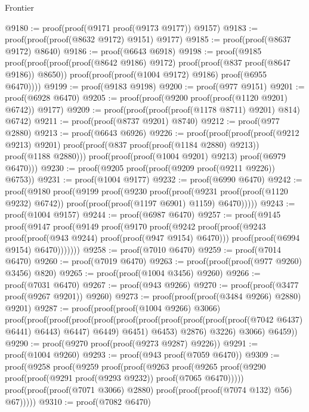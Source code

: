 \begin{lexlean}{Frontier}
\begin{coremodule}
@9180 := proof(proof(@9171 proof(@9173 @9177)) @9157)
@9183 := proof(proof(proof(@8632 @9172) @9151) @9177)
@9185 := proof(proof(@8637 @9172) @8640)
@9186 := proof(@6643 @6918)
@9198 := proof(@9185
      proof(proof(proof(proof(@8642 @9186) @9172) proof(proof(@837 proof(@8647 @9186)) @8650))
          proof(proof(proof(@1004 @9172) @9186) proof(@6955 @6470))))
@9199 := proof(@9183 @9198)
@9200 := proof(@977 @9151)
@9201 := proof(@6928 @6470)
@9205 := proof(proof(@9200 proof(proof(@1120 @9201) @6742)) @9177)
@9209 := proof(proof(proof(proof(@1178 @8711) @9201) @814) @6742)
@9211 := proof(proof(@8737 @9201) @8740)
@9212 := proof(@977 @2880)
@9213 := proof(@6643 @6926)
@9226 := proof(proof(proof(proof(@9212 @9213) @9201)
        proof(proof(@837 proof(proof(@1184 @2880) @9213)) proof(@1188 @2880)))
      proof(proof(proof(@1004 @9201) @9213) proof(@6979 @6470)))
@9230 := proof(@9205 proof(proof(@9209 proof(@9211 @9226)) @6753))
@9231 := proof(@1004 @9177)
@9232 := proof(@6990 @6470)
@9242 := proof(@9180
      proof(@9199
          proof(@9230
              proof(proof(@9231 proof(proof(@1120 @9232) @6742))
                  proof(proof(proof(@1197 @6901) @1159) @6470)))))
@9243 := proof(@1004 @9157)
@9244 := proof(@6987 @6470)
@9257 := proof(@9145
      proof(@9147
          proof(@9149
              proof(@9170
                  proof(@9242
                      proof(proof(@9243 proof(proof(@943 @9244) proof(proof(@947 @9154) @6470)))
                          proof(proof(@6994 @9154) @6470)))))))
@9258 := proof(@7010 @6470)
@9259 := proof(@7014 @6470)
@9260 := proof(@7019 @6470)
@9263 := proof(proof(proof(@977 @9260) @3456) @820)
@9265 := proof(proof(@1004 @3456) @9260)
@9266 := proof(@7031 @6470)
@9267 := proof(@943 @9266)
@9270 := proof(proof(@3477 proof(@9267 @9201)) @9260)
@9273 := proof(proof(proof(@3484 @9266) @2880) @9201)
@9287 := proof(proof(proof(@1004 @9266) @3066)
      proof(proof(proof(proof(proof(proof(proof(proof(proof(proof(proof(@7042 @6437) @6441) @6443)
                        @6447)
                      @6449)
                    @6451)
                  @6453)
                @2876)
              @3226)
            @3066)
          @6459))
@9290 := proof(@9270 proof(proof(@9273 @9287) @9226))
@9291 := proof(@1004 @9260)
@9293 := proof(@943 proof(@7059 @6470))
@9309 := proof(@9258
      proof(@9259
          proof(proof(@9263
                proof(@9265 proof(@9290 proof(proof(@9291 proof(@9293 @9232)) proof(@7065 @6470)))))
              proof(proof(proof(@7071 @3066) @2880) proof(proof(proof(@7074 @132) @56) @67)))))
@9310 := proof(@7082 @6470)

\end{coremodule}
\end{lexlean}
